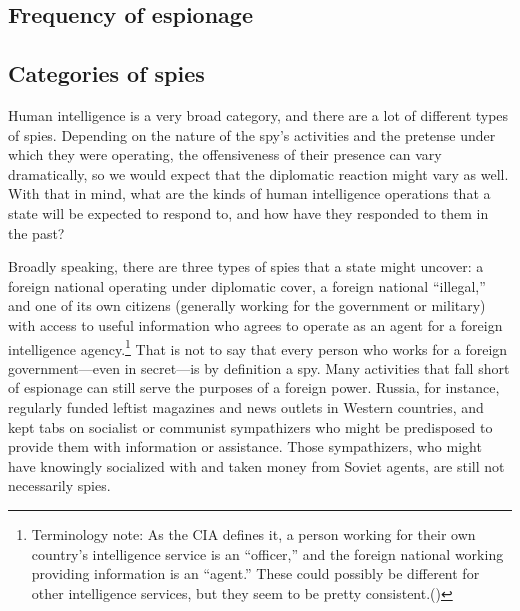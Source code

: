 \documentclass{memoir}
\begin{document}
\begin{refsegment}

\section{Frequency of espionage}
\subsection{Categories of spies}
Human intelligence is a very broad category, and there are a lot of different types of spies. Depending on the nature of the spy's activities and the pretense under which they were operating, the offensiveness of their presence can vary dramatically, so we would expect that the diplomatic reaction might vary as well. With that in mind, what are the kinds of human intelligence operations that a state will be expected to respond to, and how have they responded to them in the past?

Broadly speaking, there are three types of spies that a state might uncover: a foreign national operating under diplomatic cover, a foreign national ``illegal,'' and one of its own citizens (generally working for the government or military) with access to useful information who agrees to operate as an agent for a foreign intelligence agency.\footnote{Terminology note: As the CIA defines it, a person working for their own country's intelligence service is an ``officer,'' and the foreign national working providing information is an ``agent.'' These could possibly be different for other intelligence services, but they seem to be pretty consistent.(\cite{cia_insider_2019})} That is not to say that every person who works for a foreign government---even in secret---is by definition a spy. Many activities that fall short of espionage can still serve the purposes of a foreign power. Russia, for instance, regularly funded leftist magazines and news outlets in Western countries, and kept tabs on socialist or communist sympathizers who might be predisposed to provide them with information or assistance. Those sympathizers, who might have knowingly socialized with and taken money from Soviet agents, are still not necessarily spies.


\end{refsegment}
\end{document}
